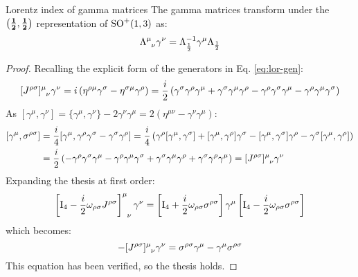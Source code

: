 \begin{theorem}{Lorentz index of gamma matrices}{}
  The gamma matrices transform under the $ \mathbf{\left( \frac{1}{2},\frac{1}{2} \right)} $ representation of $ \mathrm{SO}^+(1,3) $ as:
  \begin{equation}
    \tensor{\Lambda}{^\mu_\nu} \gamma^\nu = \Lambda_{\frac{1}{2}}^{-1} \gamma^\mu \Lambda_{\frac{1}{2}}
  \end{equation}

  \tcblower

  \begin{proof}
    Recalling the explicit form of the generators in Eq. \ref{eq:lor-gen}:
    \begin{equation*}
      \tensor{[J^{\rho \sigma}]}{^\mu_\nu} \gamma^\nu = i \left( \eta^{\rho \mu} \gamma^\sigma - \eta^{\sigma \mu} \gamma^\rho \right) = \frac{i}{2} \left( \gamma^\sigma \gamma^\rho \gamma^\mu + \gamma^\sigma \gamma^\mu \gamma^\rho - \gamma^\rho \gamma^\sigma \gamma^\mu - \gamma^\rho \gamma^\mu \gamma^\sigma \right)
    \end{equation*}
    As $ [\gamma^\mu , \gamma^\nu] = \{\gamma^\mu , \gamma^\nu\} - 2 \gamma^\nu \gamma^\mu = 2 \left( \eta^{\mu \nu} - \gamma^\nu \gamma^\mu \right) $:
    \begin{equation*}
      \begin{split}
        [\gamma^\mu , \sigma^{\rho \sigma}]
        &= \frac{i}{4} [\gamma^\mu , \gamma^\rho \gamma^\sigma - \gamma^\sigma \gamma^\rho] = \frac{i}{4} \left( \gamma^\rho [\gamma^\mu , \gamma^\sigma] + [\gamma^\mu , \gamma^\rho] \gamma^\sigma - [\gamma^\mu , \gamma^\sigma] \gamma^\rho - \gamma^\sigma [\gamma^\mu , \gamma^\rho] \right) \\
        &= \frac{i}{2} \left( - \gamma^\rho \gamma^\sigma \gamma^\mu - \gamma^\rho \gamma^\mu \gamma^\sigma + \gamma^\sigma \gamma^\mu \gamma^\rho + \gamma^\sigma \gamma^\rho \gamma^\mu \right) = \tensor{[J^{\rho \sigma}]}{^\mu_\nu} \gamma^\nu
      \end{split}
    \end{equation*}
    Expanding the thesis at first order:
    \begin{equation*}
      \tensor{\left[ \tens{I}_4 - \frac{i}{2} \omega_{\rho \sigma} J^{\rho \sigma} \right]}{^\mu_\nu} \gamma^\nu = \left[ \tens{I}_4 + \frac{i}{2} \omega_{\rho \sigma} \sigma^{\rho \sigma} \right] \gamma^\mu \left[ \tens{I}_4 - \frac{i}{2} \omega_{\rho \sigma} \sigma^{\rho \sigma} \right]
    \end{equation*}
    which becomes:
    \begin{equation*}
      - \tensor{[J^{\rho \sigma}]}{^\mu_\nu} \gamma^\nu = \sigma^{\rho \sigma} \gamma^\mu - \gamma^\mu \sigma^{\rho \sigma}
    \end{equation*}
    This equation has been verified, so the thesis holds.
  \end{proof}
\end{theorem}

